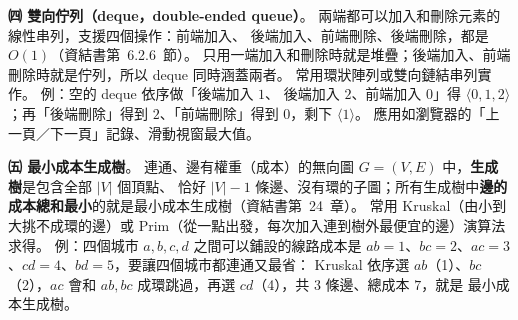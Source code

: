 \begin{pastsoln}
\textbf{㈣ 雙向佇列（deque，double-ended queue）}。 兩端都可以加入和刪除元素的線性串列，支援四個操作：前端加入、
後端加入、前端刪除、後端刪除，都是 $O(1)$（資結書第~6.2.6~節）。 只用一端加入和刪除時就是堆疊；後端加入、前端
刪除時就是佇列，所以 deque 同時涵蓋兩者。 常用環狀陣列或雙向鏈結串列實作。 例：空的 deque 依序做「後端加入 $1$、
後端加入 $2$、前端加入 $0$」得 $\langle 0, 1, 2 \rangle$；再「後端刪除」得到 $2$、「前端刪除」得到 $0$，剩下
$\langle 1 \rangle$。 應用如瀏覽器的「上一頁／下一頁」記錄、滑動視窗最大值。

\textbf{㈤ 最小成本生成樹}。 連通、邊有權重（成本）的無向圖 $G = (V, E)$ 中，\textbf{生成樹}是包含全部 $|V|$ 個頂點、
恰好 $|V| - 1$ 條邊、沒有環的子圖；所有生成樹中\textbf{邊的成本總和最小}的就是最小成本生成樹（資結書第~24~章）。
常用 Kruskal（由小到大挑不成環的邊）或 Prim（從一點出發，每次加入連到樹外最便宜的邊）演算法求得。 例：四個城市
$a, b, c, d$ 之間可以鋪設的線路成本是 $ab = 1$、$bc = 2$、$ac = 3$、$cd = 4$、$bd = 5$，要讓四個城市都連通又最省：
Kruskal 依序選 $ab$（1）、$bc$（2），$ac$ 會和 $ab, bc$ 成環跳過，再選 $cd$（4），共 $3$ 條邊、總成本 $7$，就是
最小成本生成樹。
\end{pastsoln}
